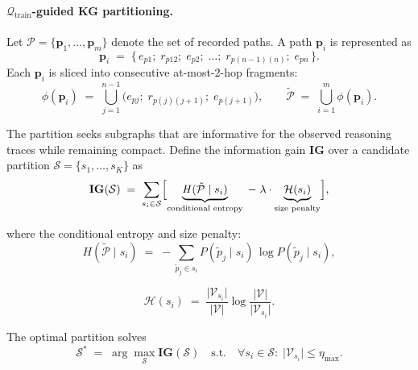 \documentclass[sigconf]{acmart}
\begin{document}
\paragraph{\(\mathcal{Q}_{\text{train}}\)-guided KG partitioning.}
Let \(\mathcal{P}=\{\mathbf{p}_1,\ldots,\mathbf{p}_m\}\) denote the set of recorded paths.
A path \(\mathbf{p}_i\) is represented as
\begin{equation}
\label{eq:path-repr}
\mathbf{p}_i \;=\; \bigl\{\, e_{p1};\; r_{p12};\; e_{p2};\; \ldots;\; r_{p(n-1)(n)};\; e_{pn} \,\bigr\}.
\end{equation}
Each \(\mathbf{p}_i\) is sliced into consecutive at-most-2-hop fragments:
\begin{equation}
\label{eq:twohop-slices}
\phi(\mathbf{p}_i) \;=\; \bigcup_{j=1}^{n-1} \bigl( e_{pj};\; r_{p(j)(j+1)};\; e_{p(j+1)} \bigr),
\qquad
\tilde{\mathcal{P}} \;=\; \bigcup_{i=1}^{m} \phi(\mathbf{p}_i).
\end{equation}


The partition seeks subgraphs that are informative for the observed reasoning traces while remaining compact.
Define the information gain \(\mathbf{IG}\) over a candidate partition \(\mathcal{S}=\{s_1,\ldots,s_K\}\) as
\begin{equation}
\label{eq:ig}
\mathbf{IG}(\mathcal{S})
\;=\;
\sum_{s_i \in \mathcal{S}}
\Bigl[
\underbrace{\mathit{H}(\tilde{\mathcal{P}}\mid s_i)}_{\text{conditional entropy}}
\;-\;
\lambda \cdot
\underbrace{\mathcal{H}(s_i)}_{\text{size penalty}}
\Bigr],
\end{equation}

where the conditional entropy and size penalty:
\begin{equation}
\label{eq:cond-entropy}
\mathit{H}(\tilde{\mathcal{P}}\mid s_i)
\;=\;
-\sum_{\tilde{p}_j \in s_i}
P(\tilde{p}_j \mid s_i)\,\log P(\tilde{p}_j \mid s_i),
\end{equation}

\begin{equation}
\label{eq:size-penalty}
\mathcal{H}(s_i)
\;=\;
\frac{\lvert \mathcal{V}_{s_i} \rvert}{\lvert \mathcal{V} \rvert}
\log \frac{\lvert \mathcal{V} \rvert}{\lvert \mathcal{V}_{s_i} \rvert}.
\end{equation}

The optimal partition solves
\begin{equation}
\label{eq:subpart}
\mathcal{S}^*
\;=\;
\arg\max_{\mathcal{S}}
\mathbf{IG}(\mathcal{S})
\quad
\text{s.t.}\quad
\forall s_i \in \mathcal{S}:\; \lvert \mathcal{V}_{s_i} \rvert \le \eta_{\max}.
\end{equation}
\end{document}
